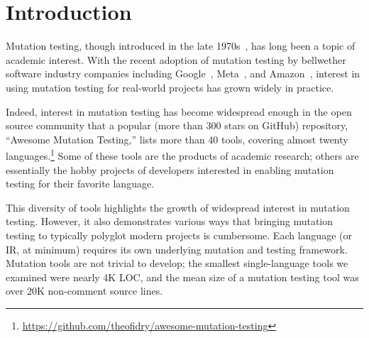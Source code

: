 \documentclass[acmsmall]{acmart}
\begin{document}





\maketitle

\section{Introduction}

Mutation testing, though introduced in the late
1970s~\cite{demillo1978hints,mathur2012foundations,demillo1978hints},
has long been a topic of academic interest.  With the recent adoption of mutation
testing by bellwether software industry companies including
Google~\cite{GoogleMut}, Meta~\cite{BellerFacebookMutation}, and
Amazon~\cite{AmazonMut}, interest in using mutation testing for
real-world projects has grown widely in practice.

Indeed, interest in mutation testing has become widespread enough in the open
source community that a popular (more than 300 stars on GitHub)
repository, ``Awesome Mutation Testing,'' lists more than 40 tools,
covering almost twenty languages.\footnote{\url{https://github.com/theofidry/awesome-mutation-testing}}  Some of
these tools are the products of academic research; others are
essentially the hobby projects of developers interested in enabling
mutation testing for their favorite language.

This diversity of tools highlights the growth of widespread interest in mutation
testing.  However, it also demonstrates various ways that bringing mutation testing to
typically polyglot modern projects is cumbersome. Each language (or IR, at
minimum) requires its own underlying mutation and testing framework.
Mutation tools are not trivial to develop; the smallest
single-language tools we examined were nearly 4K LOC, and the mean size
of a mutation testing tool was over 20K non-comment source lines.
\end{document}
